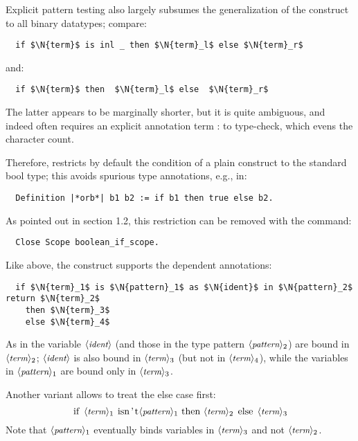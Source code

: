 Explicit pattern testing also largely subsumes the generalization of
the  construct to all binary datatypes; compare:
\begin{lstlisting}
  if $\N{term}$ is inl _ then $\N{term}_l$ else $\N{term}_r$
\end{lstlisting}
and:
\begin{lstlisting}
  if $\N{term}$ then  $\N{term}_l$ else  $\N{term}_r$
\end{lstlisting}
The latter appears to be marginally shorter, but it is quite
ambiguous, and indeed often
requires an explicit annotation term : \C{{_}+{_}} to type-check,
which evens the character count.

Therefore, \ssr{} restricts by default the condition of a plain 
construct to the standard bool type; this avoids spurious type
annotations, e.g., in:
\begin{lstlisting}
  Definition |*orb*| b1 b2 := if b1 then true else b2.
\end{lstlisting}
As pointed out in section 1.2, this restriction can be removed with
the command:
\begin{lstlisting}
  Close Scope boolean_if_scope.
\end{lstlisting}
Like  above, the  construct
supports the dependent  annotations:
\begin{lstlisting}
  if $\N{term}_1$ is $\N{pattern}_1$ as $\N{ident}$ in $\N{pattern}_2$ return $\N{term}_2$
    then $\N{term}_3$
    else $\N{term}_4$
\end{lstlisting}
As in  the variable $\langle\mbox{\itshape\rmfamily\small ident}\rangle$ (and those in
the type pattern $\langle\mbox{\itshape\rmfamily\small pattern}\rangle_2$) are bound in $\langle\mbox{\itshape\rmfamily\small term}\rangle_2$; $\langle\mbox{\itshape\rmfamily\small ident}\rangle$ is
also bound in $\langle\mbox{\itshape\rmfamily\small term}\rangle_3$ (but not in $\langle\mbox{\itshape\rmfamily\small term}\rangle_4$), while the
variables in $\langle\mbox{\itshape\rmfamily\small pattern}\rangle_1$ are bound only in $\langle\mbox{\itshape\rmfamily\small term}\rangle_3$.

\noindent
Another variant allows to treat the else case first:
\[\C{if}\ \N{term}_1\ \C{isn't }\N{pattern}_1\ \C{then}\ \N{term}_2\ \C{else}
\ \N{term}_3\]
Note that $\langle\mbox{\itshape\rmfamily\small pattern}\rangle_1$ eventually binds variables in $\langle\mbox{\itshape\rmfamily\small term}\rangle_3$
and not $\langle\mbox{\itshape\rmfamily\small term}\rangle_2$.

